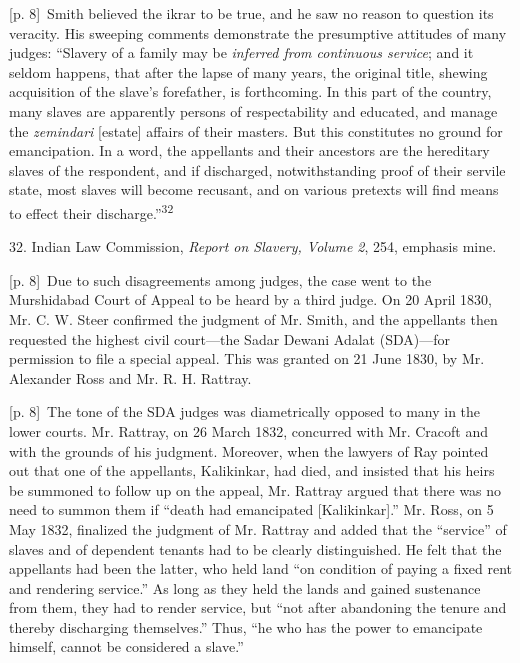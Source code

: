 \documentclass[10pt,a4paper]{article}
\begin{document}
{\scriptsize\color{gray} [p. 8]}\ Smith believed the ikrar to be true, and he saw no reason to question its veracity. His sweeping comments demonstrate the presumptive attitudes of many judges: “Slavery of a family may be \textit{inferred from continuous service}; and it seldom happens, that after the lapse of many years, the original title, shewing acquisition of the slave’s forefather, is forthcoming. In this part of the country, many slaves are apparently persons of respectability and educated, and manage the \textit{zemindari} [estate] affairs of their masters. But this constitutes no ground for emancipation. In a word, the appellants and their ancestors are the hereditary slaves of the respondent, and if discharged, notwithstanding proof of their servile state, most slaves will become recusant, and on various pretexts will find means to effect their discharge.”\nobreak\textsuperscript{32}\par{\small 32. Indian Law Commission, \textit{Report on Slavery, Volume 2}, 254, emphasis mine.\par}
{\scriptsize\color{gray} [p. 8]}\ Due to such disagreements among judges, the case went to the Murshidabad Court of Appeal to be heard by a third judge. On 20 April 1830, Mr. C. W. Steer confirmed the judgment of Mr. Smith, and the appellants then requested the highest civil court—the Sadar Dewani Adalat (SDA)—for permission to file a special appeal. This was granted on 21 June 1830, by Mr. Alexander Ross and Mr. R. H. Rattray.\par
{\scriptsize\color{gray} [p. 8]}\ The tone of the SDA judges was diametrically opposed to many in the lower courts. Mr. Rattray, on 26 March 1832, concurred with Mr. Cracoft and with the grounds of his judgment. Moreover, when the lawyers of Ray pointed out that one of the appellants, Kalikinkar, had died, and insisted that his heirs be summoned to follow up on the appeal, Mr. Rattray argued that there was no need to summon them if “death had emancipated [Kalikinkar].” Mr. Ross, on 5 May 1832, finalized the judgment of Mr. Rattray and added that the “service” of slaves and of dependent tenants had to be clearly distinguished. He felt that the appellants had been the latter, who held land “on condition of paying a fixed rent and rendering service.” As long as they held the lands and gained sustenance from them, they had to render service, but “not after abandoning the tenure and thereby discharging themselves.” Thus, “he who has the power to emancipate himself, cannot be considered a slave.”\par
\end{document}

